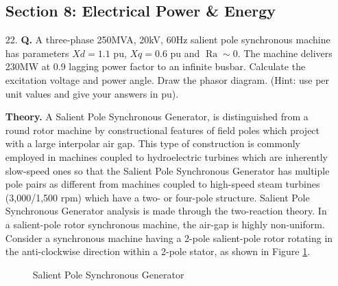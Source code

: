 \documentclass[main.tex]{subfiles}
\begin{document}
\begin{enumerate}

\subsection*{Section 8: Electrical Power \& Energy}

\item[22.] \textbf{Q.} A three-phase 250MVA, 20kV, 60Hz salient pole synchronous machine has parameters $Xd = 1.1$ pu, $Xq = 0.6$ pu and $\operatorname{Ra} \sim 0$. The machine delivers 230MW at 0.9 lagging power factor to an infinite busbar. Calculate the excitation voltage and power angle. Draw the phasor diagram. (Hint: use per unit values and give your answers in pu). 

\textbf{Theory.} A Salient Pole Synchronous Generator, is distinguished from a round rotor machine by constructional features of field poles which project with a large interpolar air gap. This type of construction is commonly employed in machines coupled to hydroelectric turbines which are inherently slow-speed ones so that the Salient Pole Synchronous Generator has multiple pole pairs as different from machines coupled to high-speed steam turbines (3,000/1,500 rpm) which have a two- or four-pole structure. Salient Pole Synchronous Generator analysis is made through the two-reaction theory. In a salient-pole rotor synchronous machine, the air-gap is highly non-uniform. Consider a synchronous machine having a 2-pole salient-pole rotor rotating in the anti-clockwise direction within a 2-pole stator, as shown in Figure \ref{fig:22a_a}. 

\begin{figure}
\centering{}
\caption{Salient Pole Synchronous Generator}
\label{fig:22a_a}
\end{figure}


\end{enumerate}
\end{document}
